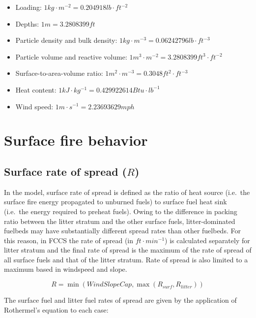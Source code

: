 \documentclass[]{book}
\providecommand{\tightlist}{%
  \setlength{\itemsep}{0pt}\setlength{\parskip}{0pt}}
\begin{document}
\begin{itemize}
\tightlist
\item
  Loading: \(1 kg\cdot m^{-2} = 0.204918 lb\cdot ft^{-2}\)
\item
  Depths: \(1m = 3.2808399ft\)
\item
  Particle density and bulk density:
  \(1 kg\cdot m^{-3} = 0.06242796 lb\cdot ft^{-3}\)
\item
  Particle volume and reactive volume:
  \(1 m^{3}\cdot m^{-2} = 3.2808399 ft^{3}\cdot ft^{-2}\)
\item
  Surface-to-area-volume ratio:
  \(1 m^{2}\cdot m^{-3} = 0.3048 ft^{2}\cdot ft^{-3}\)
\item
  Heat content: \(1kJ\cdot kg^{-1} = 0.429922614 Btu\cdot lb^{-1}\)
\item
  Wind speed: \(1 m \cdot s^{-1} = 2.23693629 mph\)
\end{itemize}

\section{Surface fire behavior}\label{surface-fire-behavior}

\subsection{\texorpdfstring{Surface rate of spread
(\(R\))}{Surface rate of spread (R)}}\label{surface-rate-of-spread-r}

In the \citet{Rothermel1972} model, surface rate of spread is defined as
the ratio of heat source (i.e.~the surface fire energy propagated to
unburned fuels) to surface fuel heat sink (i.e.~the energy required to
preheat fuels). Owing to the difference in packing ratio between the
litter stratum and the other surface fuels, litter-dominated fuelbeds
may have substantially different spread rates than other fuelbeds. For
this reason, in FCCS the rate of spread (in \(ft \cdot min^{-1}\)) is
calculated separately for litter stratum and the final rate of spread is
the maximum of the rate of spread of all surface fuels and that of the
litter stratum. Rate of spread is also limited to a maximum based in
windspeed and slope.

\begin{equation}
R = \min(WindSlopeCap, \max(R_{surf}, R_{litter}))
\end{equation}

The surface fuel and litter fuel rates of spread are given by the
application of Rothermel's \citeyearpar{Rothermel1972} equation to each
case:
\end{document}
